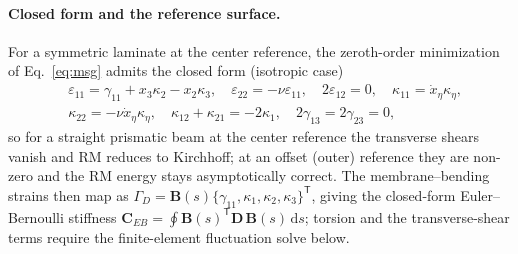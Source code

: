 \documentclass[preprint,12pt]{elsarticle}
\newcommand{\T}{^{\mathsf{T}}}
\newcommand{\eps}{\varepsilon}
\newcommand{\bC}{\mathbf{C}}
\newcommand{\bD}{\mathbf{D}}
\begin{document}
\paragraph{Closed form and the reference surface.} For a symmetric laminate at
the center reference, the zeroth-order minimization of Eq.~\eqref{eq:msg} admits
the closed form (isotropic case)
\begin{equation}
\begin{aligned}
&\eps_{11}=\gamma_{11}+x_3\kappa_2-x_2\kappa_3,\quad
\eps_{22}=-\nu\eps_{11},\quad 2\eps_{12}=0,\quad
\kappa_{11}=\dot{x}_\eta\kappa_\eta,\\
&\kappa_{22}=-\nu\dot{x}_\eta\kappa_\eta,\quad
\kappa_{12}{+}\kappa_{21}=-2\kappa_1,\quad
2\gamma_{13}=2\gamma_{23}=0,
\end{aligned}
\end{equation}
so for a straight prismatic beam at the center reference the transverse shears
vanish and RM reduces to Kirchhoff; at an offset (outer) reference they are
non-zero and the RM energy stays asymptotically correct. The membrane--bending
strains then map as $\Gamma_D=\mathbf{B}(s)\{\gamma_{11},\kappa_1,\kappa_2,
\kappa_3\}\T$, giving the closed-form Euler--Bernoulli stiffness
$\bC_{EB}=\oint\mathbf{B}(s)\T\bD\,\mathbf{B}(s)\,\mathrm{d}s$; torsion and the
transverse-shear terms require the finite-element fluctuation solve below.
\end{document}
